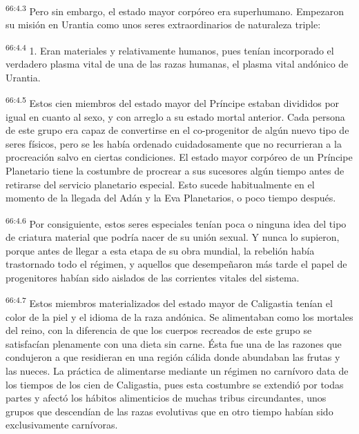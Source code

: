 \par
\textsuperscript{66:4.3} Pero sin embargo, el estado mayor corpóreo era superhumano. Empezaron su misión en Urantia como unos seres extraordinarios de naturaleza triple:

\par
\textsuperscript{66:4.4} 1. Eran materiales y relativamente humanos, pues tenían incorporado el verdadero plasma vital de una de las razas humanas, el plasma vital andónico de Urantia.

\par
\textsuperscript{66:4.5} Estos cien miembros del estado mayor del Príncipe estaban divididos por igual en cuanto al sexo, y con arreglo a su estado mortal anterior. Cada persona de este grupo era capaz de convertirse en el co-progenitor de algún nuevo tipo de seres físicos, pero se les había ordenado cuidadosamente que no recurrieran a la procreación salvo en ciertas condiciones. El estado mayor corpóreo de un Príncipe Planetario tiene la costumbre de procrear a sus sucesores algún tiempo antes de retirarse del servicio planetario especial. Esto sucede habitualmente en el momento de la llegada del Adán y la Eva Planetarios, o poco tiempo después.

\par
\textsuperscript{66:4.6} Por consiguiente, estos seres especiales tenían poca o ninguna idea del tipo de criatura material que podría nacer de su unión sexual. Y nunca lo supieron, porque antes de llegar a esta etapa de su obra mundial, la rebelión había trastornado todo el régimen, y aquellos que desempeñaron más tarde el papel de progenitores habían sido aislados de las corrientes vitales del sistema.

\par
\textsuperscript{66:4.7} Estos miembros materializados del estado mayor de Caligastia tenían el color de la piel y el idioma de la raza andónica. Se alimentaban como los mortales del reino, con la diferencia de que los cuerpos recreados de este grupo se satisfacían plenamente con una dieta sin carne. Ésta fue una de las razones que condujeron a que residieran en una región cálida donde abundaban las frutas y las nueces. La práctica de alimentarse mediante un régimen no carnívoro data de los tiempos de los cien de Caligastia, pues esta costumbre se extendió por todas partes y afectó los hábitos alimenticios de muchas tribus circundantes, unos grupos que descendían de las razas evolutivas que en otro tiempo habían sido exclusivamente carnívoras.

